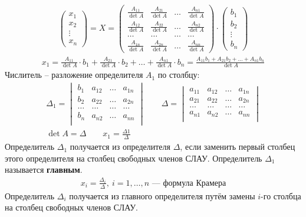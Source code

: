 \begin{gather*}
\begin{pmatrix} x_1 \\ x_2 \\ \vdots \\ x_n \end{pmatrix} = X = \begin{pmatrix}
\frac{A_{11}}{\det A} & \frac{A_{21}}{\det A} & \ldots & \frac{A_{n1}}{\det A} \\[1ex]
\frac{A_{12}}{\det A} & \frac{A_{22}}{\det A} & \ldots & \frac{A_{n2}}{\det A} \\[1ex]
\ldots & \ldots & \ldots & \ldots\\[1ex]
\frac{A_{1n}}{\det A} & \frac{A_{2n}}{\det A} & \ldots & \frac{A_{nn}}{\det A}
\end{pmatrix} \cdot \begin{pmatrix}
b_1\\
b_2\\
\vdots\\
b_n
\end{pmatrix}
\end{gather*}
\begin{gather*}
x_1 = \frac{A_{11}}{\det A} \cdot b_1 + \frac{A_{21}}{\det A} \cdot b_2 + \ldots + \frac{A_{n1}}{\det A} \cdot b_n = \frac{A_{11}b_1 + A_{21}b_2 + \ldots + A_{n1}b_n}{\det A}
\end{gather*}
Числитель -- разложение определителя $A_1$ по столбцу: 
\begin{gather*}
\Delta_1 = \begin{vmatrix}
b_1 & a_{12} & \ldots & a_{1n} \\
b_2 & a_{22} & \ldots & a_{2n} \\
\ldots & \ldots & \ldots & \ldots \\
b_n & a_{n2} & \ldots & a_{nn} \\
\end{vmatrix}\qquad \Delta = \begin{vmatrix}
a_{11} & a_{12} & \ldots & a_{1n} \\
a_{21} & a_{22} & \ldots & a_{2n} \\
\ldots & \ldots & \ldots & \ldots \\
a_{n1} & a_{n2} & \ldots & a_{nn} \\
\end{vmatrix}\\
\det A = \Delta\qquad x_1 = \frac{\Delta 1}{\Delta}
\end{gather*}
Определитель $\Delta_1$ получается из определителя $\Delta$, если заменить первый столбец этого определителя на столбец свободных членов СЛАУ.
Определитель $\Delta_1$ называется \textbf{главным}. \vspace{-\topsep}
\begin{gather*}
\boxed{x_i = \frac{\Delta_i}{\Delta}},\ i = 1,\ldots,n \textbf{ --- формула Крамера}
\end{gather*}
Определитель $\Delta_i$ получается из главного определителя путём замены $i$-го столбца на столбец свободных членов СЛАУ.

